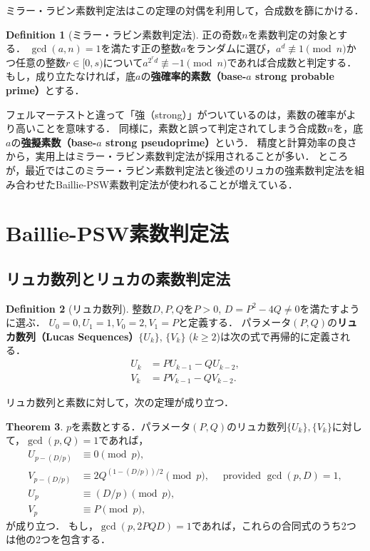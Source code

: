 \documentclass[uplatex]{jsarticle}
\theoremstyle{definition}
\newtheorem{dfn}{Definition}[section]
\newtheorem{thm}[dfn]{Theorem}
\begin{document}
ミラー・ラビン素数判定法はこの定理の対偶を利用して，合成数を篩にかける．

\begin{dfn}[ミラー・ラビン素数判定法]
    正の奇数$n$を素数判定の対象とする．
    $\gcd(a,n)=1$を満たす正の整数$a$をランダムに選び，$a^d \not\equiv 1 \pmod{n}$かつ任意の整数$r \in [0, s)$について$a^{2^rd} \not\equiv -1 \pmod{n}$であれば合成数と判定する．
    もし，成り立たなければ，底$a$の\textbf{強確率的素数（base-$a$ strong probable prime）}とする．
\end{dfn}

フェルマーテストと違って「強（strong）」がついているのは，素数の確率がより高いことを意味する．
同様に，素数と誤って判定されてしまう合成数$n$を，底$a$の\textbf{強擬素数（base-$a$ strong pseudoprime）}という．
精度と計算効率の良さから，実用上はミラー・ラビン素数判定法が採用されることが多い．
ところが，最近ではこのミラー・ラビン素数判定法と後述のリュカの強素数判定法を組み合わせたBaillie-PSW素数判定法が使われることが増えている．

\section{Baillie-PSW素数判定法}

\subsection{リュカ数列とリュカの素数判定法}

\begin{dfn}[リュカ数列]
    
整数$D, P, Q$を$P>0$, $D = P^2 - 4Q \ne 0$を満たすように選ぶ．
$U_0=0, U_1=1, V_0=2, V_1=P$と定義する．
パラメータ$(P, Q)$の\textbf{リュカ数列（Lucas Sequences）}$\{U_k\}$, $\{V_k\}$ ($k\geq2$)は次の式で再帰的に定義される．
\begin{align}
    U_k &= PU_{k-1} - QU_{k-2},\\
    V_k &= PV_{k-1} - QV_{k-2}.
\end{align}

\end{dfn}

リュカ数列と素数に対して，次の定理が成り立つ．

\begin{thm}
    $p$を素数とする．パラメータ$(P, Q)$のリュカ数列$\{U_k\}, \{V_k\}$に対して，$\gcd(p,Q)=1$であれば，
    \begin{align}
        U_{p-(D/p)} & \equiv 0 \pmod{p}, \\
        V_{p-(D/p)} & \equiv 2 Q^{(1-(D / p)) / 2} \pmod{p}, \quad \text { provided } \gcd(p, D)=1, \\
        U_p & \equiv(D / p) \pmod{p}, \label{eq:dame1} \\
        V_p & \equiv P \pmod{p}, \label{eq:dame2}
    \end{align}
    が成り立つ．
    もし，$\gcd(p, 2PQD)=1$であれば，これらの合同式のうち2つは他の2つを包含する．
\end{thm}
\end{document}
